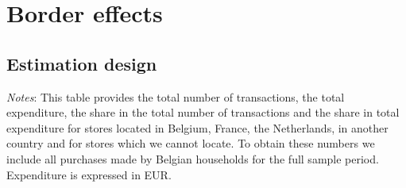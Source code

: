 \section{Border effects}
\subsection{Estimation design}
\begin{table}[H]
	\centering		
    \caption{Cross-border shopping - Overall}
    \label{tab: app_border_eff_spectest_cbshopping_overall}
	\begin{spacing}{1.1}
    \end{spacing}
    \parbox{\textwidth}{
        \begin{spacing}{1} 
            {\footnotesize 
            \textit{Notes}: This table provides the total number of transactions, the total expenditure, the share in the total number of transactions and the share in total expenditure for stores located in Belgium, France, the Netherlands, in another country and for stores which we cannot locate. To obtain these numbers we include all purchases made by Belgian households for the full sample period. Expenditure is expressed in EUR.}
        \end{spacing}}
\end{table}

